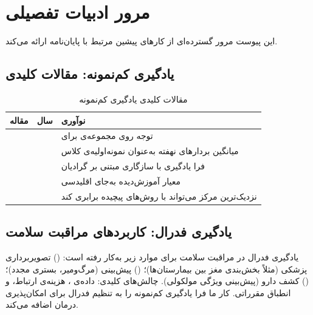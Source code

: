 \chapter{مرور ادبیات تفصیلی}
\label{app:literature}

این پیوست مرور گسترده‌ای از کارهای پیشین مرتبط با پایان‌نامه ارائه می‌کند.

\section{یادگیری کم‌نمونه: مقالات کلیدی}

\begin{table}[htbp]
\centering
\caption{مقالات کلیدی یادگیری کم‌نمونه}
\footnotesize
\setlength{\tabcolsep}{2pt}
\renewcommand{\arraystretch}{1.14}
\begin{tabularx}{\linewidth}{@{}L{3.2cm}C{1.2cm}Y@{}}
\toprule
\textbf{مقاله} & \textbf{سال} & \textbf{نوآوری} \\
\midrule
{} &  & توجه روی مجموعه‌ی  برای  \\
 &  & میانگین بردارهای نهفته به‌عنوان نمونه‌اولیه‌ی کلاس \\
 &  & فرا یادگیری با سازگاری مبتنی بر گرادیان \\
 &  & معیار آموزش‌دیده به‌جای اقلیدسی \\
 &  & نزدیک‌ترین مرکز می‌تواند با روش‌های پیچیده برابری کند \\
\bottomrule
\end{tabularx}
\label{tab:fsl_papers}
\end{table}

\section{یادگیری فدرال: کاربردهای مراقبت سلامت}

یادگیری فدرال در مراقبت سلامت برای موارد زیر به‌کار رفته است: () تصویربرداری پزشکی (مثلاً بخش‌بندی  مغز بین بیمارستان‌ها)؛ () پیش‌بینی  (مرگ‌ومیر، بستری مجدد)؛ () کشف دارو (پیش‌بینی ویژگی مولکولی). چالش‌های کلیدی: داده‌ی ، هزینه‌ی ارتباط، و انطباق مقرراتی. کار ما فرا یادگیری کم‌نمونه را به تنظیم فدرال برای امکان‌پذیری درمان اضافه می‌کند.

